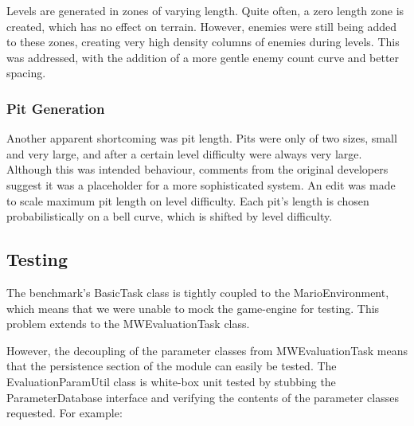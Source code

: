 Levels are generated in zones of varying length. Quite often, a zero length zone is created, which has no effect on terrain. However, enemies were still being added to these zones, creating very high density columns of enemies during levels. This was addressed, with the addition of a more gentle enemy count curve and better spacing.

\subsubsection{Pit Generation}

Another apparent shortcoming was pit length. Pits were only of two sizes, small and very large, and after a certain level difficulty were always very large. Although this was intended behaviour, comments from the original developers suggest it was a placeholder for a more sophisticated system. An edit was made to scale maximum pit length on level difficulty. Each pit's length is chosen probabilistically on a bell curve, which is shifted by level difficulty.



\subsection{Testing}
\label{subsec:lptest}

The benchmark's BasicTask class is tightly coupled to the MarioEnvironment, which means that we were unable to mock the game-engine for testing. This problem extends to the MWEvaluationTask class.

However, the decoupling of the parameter classes from MWEvaluationTask means that the persistence section of the module can easily be tested. The EvaluationParamUtil class is white-box unit tested by stubbing the ParameterDatabase interface and verifying the contents of the parameter classes requested. For example:

